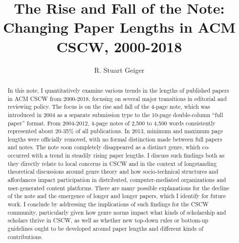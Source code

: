 \documentclass[format=acmsmall, screen=true]{acmart}
\begin{document}
%
\title{The Rise and Fall of the Note: Changing Paper Lengths in ACM CSCW, 2000-2018}


\author{R. Stuart Geiger}



%
\renewcommand{\shortauthors}{Geiger}

%
\begin{abstract}
In this note, I quantitatively examine various trends in the lengths of published papers in ACM CSCW from 2000-2018, focusing on several major transitions in editorial and reviewing policy. The focus is on the rise and fall of the 4-page note, which was introduced in 2004 as a separate submission type to the 10-page double-column ``full paper'' format. From 2004-2012, 4-page notes of 2,500 to 4,500 words consistently represented about 20-35\% of all publications. In 2013, minimum and maximum page lengths were officially removed, with no formal distinction made between full papers and notes. The note soon completely disappeared as a distinct genre, which co-occurred with a trend in steadily rising paper lengths. I discuss such findings both as they directly relate to local concerns in CSCW and in the context of longstanding theoretical discussions around genre theory and how socio-technical structures and affordances impact participation in distributed, computer-mediated organizations and user-generated content platforms. There are many possible explanations for the decline of the note and the emergence of longer and longer papers, which I identify for future work. I conclude by addressing the implications of such findings for the CSCW community, particularly given how genre norms impact what kinds of scholarship and scholars thrive in CSCW, as well as whether new top-down rules or bottom-up guidelines ought to be developed around paper lengths and different kinds of contributions.
\end{abstract}
\end{document}
